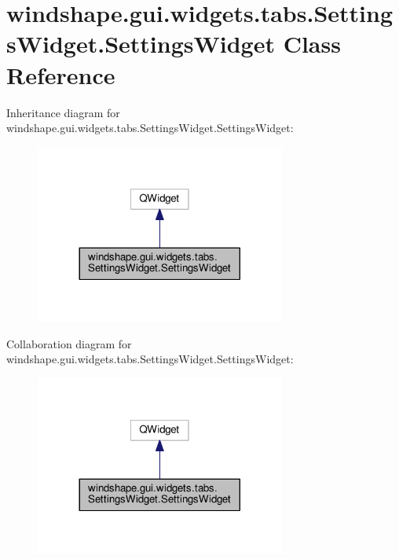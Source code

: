 \hypertarget{classwindshape_1_1gui_1_1widgets_1_1tabs_1_1_settings_widget_1_1_settings_widget}{}\section{windshape.\+gui.\+widgets.\+tabs.\+Settings\+Widget.\+Settings\+Widget Class Reference}
\label{classwindshape_1_1gui_1_1widgets_1_1tabs_1_1_settings_widget_1_1_settings_widget}


Inheritance diagram for windshape.\+gui.\+widgets.\+tabs.\+Settings\+Widget.\+Settings\+Widget\+:\nopagebreak
\begin{figure}[H]
\begin{center}
\leavevmode
\includegraphics[width=233pt]{classwindshape_1_1gui_1_1widgets_1_1tabs_1_1_settings_widget_1_1_settings_widget__inherit__graph}
\end{center}
\end{figure}


Collaboration diagram for windshape.\+gui.\+widgets.\+tabs.\+Settings\+Widget.\+Settings\+Widget\+:\nopagebreak
\begin{figure}[H]
\begin{center}
\leavevmode
\includegraphics[width=233pt]{classwindshape_1_1gui_1_1widgets_1_1tabs_1_1_settings_widget_1_1_settings_widget__coll__graph}
\end{center}
\end{figure}
